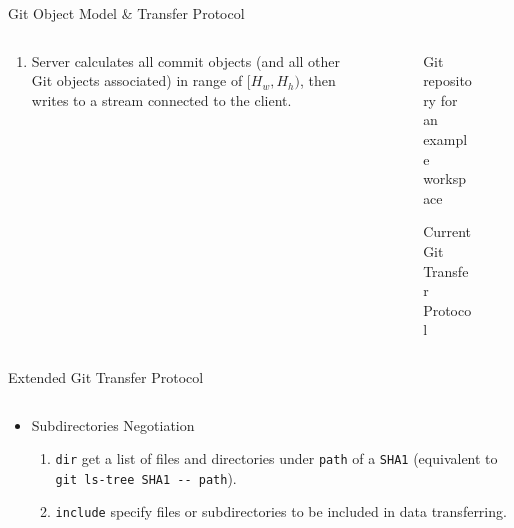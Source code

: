 \documentclass[final]{beamer}
\begin{document}
\begin{frame}[t, fragile]
\begin{columns}[t]
\begin{column}{.5\linewidth}
\begin{block}{Git Object Model \& Transfer Protocol}
\begin{columns}[T]
\begin{column}{.5\textwidth}
\begin{enumerate}
  \item Server calculates all commit objects (and all other Git objects
    associated) in range of $[H_w, H_h)$, then writes to a stream connected to
    the client.
\end{enumerate}
          \end{column}
          \begin{column}{.5\textwidth}
              \begin{figure}\centering
                \caption{Git repository for an example workspace}
                \label{fig:git-repo}
              \end{figure}
            \begin{figure} \centering
              \caption{Current Git Transfer Protocol}
            \end{figure}
          \end{column}
        \end{columns}
      \end{block}
      \begin{block}{Extended Git Transfer Protocol}

        \begin{columns}[T]
          \begin{column}{.5\textwidth}
\begin{itemize}
    \justifying
  \item Subdirectories Negotiation
    \begin{enumerate}
  \item \verb|dir| get a list of files and directories under \verb|path| of a
    \verb|SHA1| (equivalent to \verb|git ls-tree SHA1 -- path|).

  \item \verb|include| specify files or subdirectories to be included in data
    transferring.


\end{enumerate}
\end{itemize}
\end{column}
\end{columns}
\end{block}
\end{column}
\end{columns}
\end{frame}
\end{document}

